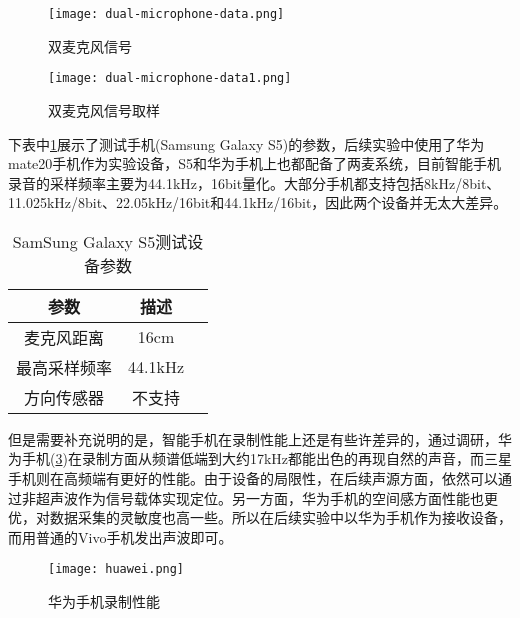 \documentclass[winfonts,oneside]{njuthesis}
\begin{document}
		\begin{figure}[H]
			\centering
			\texttt{[image: dual-microphone-data.png]} 
			\caption{双麦克风信号}
			\label{fig: dual-microphone-data}
		\end{figure}
	
		\begin{figure}[H]
			\centering
			\texttt{[image: dual-microphone-data1.png]} 
			\caption{双麦克风信号取样}
			\label{fig: dual-microphone-data1}
		\end{figure}
		
		下表中\ref{table: parameters-of-S5}展示了测试手机(Samsung Galaxy S5)的参数，后续实验中使用了华为mate20手机作为实验设备，S5和华为手机上也都配备了两麦系统，目前智能手机录音的采样频率主要为44.1kHz，16bit量化。大部分手机都支持包括8kHz/8bit、11.025kHz/8bit、22.05kHz/16bit和44.1kHz/16bit，因此两个设备并无太大差异。
		
		\begin{table}[H]
			\setlength{\belowcaptionskip}{7pt}
			\caption{SamSung Galaxy S5测试设备参数}
			\centering
			\begin{tabular}{ccc}
				\hline 
				参数 & 描述 \\
				\hline
				麦克风距离 & 16cm \\
				最高采样频率 & 44.1kHz\\
				方向传感器 & 不支持\\
				\hline
			\end{tabular} 
			\vspace{0.2cm}
			\label{table: parameters-of-S5}
		\end{table}
	
		但是需要补充说明的是，智能手机在录制性能上还是有些许差异的，通过调研，华为手机(\ref{fig: huawei})在录制方面从频谱低端到大约17kHz都能出色的再现自然的声音，而三星手机则在高频端有更好的性能。由于设备的局限性，在后续声源方面，依然可以通过非超声波作为信号载体实现定位。另一方面，华为手机的空间感方面性能也更优，对数据采集的灵敏度也高一些。所以在后续实验中以华为手机作为接收设备，而用普通的Vivo手机发出声波即可。
		
		\begin{figure}[H]
			\centering
			\texttt{[image: huawei.png]} 
			\caption{华为手机录制性能}
			\label{fig: huawei}
		\end{figure}
	
\end{document}
